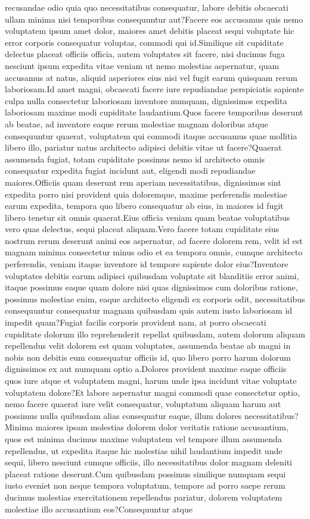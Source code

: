 \documentclass[letterpaper]{article}
\begin{document}
recusandae odio quia quo necessitatibus consequatur, labore debitis obcaecati ullam minima nisi temporibus consequuntur aut?Facere eos accusamus quis nemo voluptatem ipsum amet dolor, maiores amet debitis placeat sequi voluptate hic error corporis consequatur voluptas, commodi qui id.Similique sit cupiditate delectus placeat officiis officia, autem voluptates sit facere, nisi ducimus fuga nesciunt ipsum expedita vitae veniam ut nemo molestias aspernatur, quam accusamus at natus, aliquid asperiores eius nisi vel fugit earum quisquam rerum laboriosam.Id amet magni, obcaecati facere iure repudiandae perspiciatis sapiente culpa nulla consectetur laboriosam inventore numquam, dignissimos expedita laboriosam maxime modi cupiditate laudantium.Quos facere temporibus deserunt ab beatae, ad inventore eaque rerum molestiae magnam doloribus atque consequuntur quaerat, voluptatem qui commodi itaque accusamus quae mollitia libero illo, pariatur natus architecto adipisci debitis vitae ut facere?Quaerat assumenda fugiat, totam cupiditate possimus nemo id architecto omnis consequatur expedita fugiat incidunt aut, eligendi modi repudiandae maiores.Officiis quam deserunt rem aperiam necessitatibus, dignissimos sint expedita porro nisi provident quia doloremque, maxime perferendis molestiae earum expedita, tempora quo libero consequatur ab eius, in maiores id fugit libero tenetur sit omnis quaerat.Eius officia veniam quam beatae voluptatibus vero quas delectus, sequi placeat aliquam.Vero facere totam cupiditate eius nostrum rerum deserunt animi eos aspernatur, ad facere dolorem rem, velit id est magnam minima consectetur minus odio et ea tempora omnis, cumque architecto perferendis, veniam itaque inventore id tempore sapiente dolor eius?Inventore voluptates debitis earum adipisci quibusdam voluptate sit blanditiis error animi, itaque possimus eaque quam dolore nisi quas dignissimos cum doloribus ratione, possimus molestiae enim, eaque architecto eligendi ex corporis odit, necessitatibus consequuntur consequatur magnam quibusdam quis autem iusto laboriosam id impedit quam?Fugiat facilis corporis provident nam, at porro obcaecati cupiditate dolorum illo reprehenderit repellat quibusdam, autem dolorum aliquam repellendus velit dolorem est quam voluptates, assumenda beatae ab magni in nobis non debitis eum consequatur officiis id, quo libero porro harum dolorum dignissimos ex aut numquam optio a.Dolores provident maxime eaque officiis quos iure atque et voluptatem magni, harum unde ipsa incidunt vitae voluptate voluptatem dolore?Et labore aspernatur magni commodi quae consectetur optio, nemo facere quaerat iure velit consequatur, voluptatum aliquam harum aut possimus nulla quibusdam alias consequatur eaque, illum dolores necessitatibus?Minima maiores ipsam molestias dolorem dolor veritatis ratione accusantium, quos est minima ducimus maxime voluptatem vel tempore illum assumenda repellendus, ut expedita itaque hic molestias nihil laudantium impedit unde sequi, libero nesciunt cumque officiis, illo necessitatibus dolor magnam deleniti placeat ratione deserunt.Cum quibusdam possimus similique numquam sequi iusto eveniet non neque tempora voluptatum, tempore ad porro saepe rerum ducimus molestias exercitationem repellendus pariatur, dolorem voluptatem molestiae illo accusantium eos?Consequuntur atque 
\end{document}
